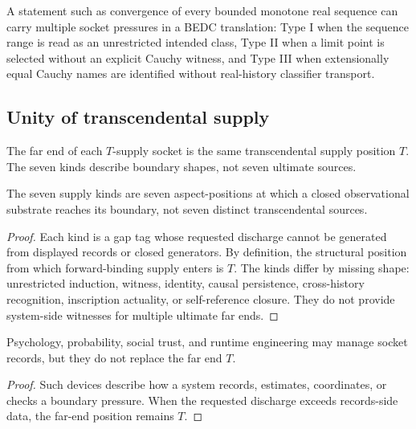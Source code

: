 \begin{example}
\label{ex:philosophy-analysis-socket-stack}
A statement such as convergence of every bounded monotone real sequence
can carry multiple socket pressures in a BEDC translation: Type I when
the sequence range is read as an unrestricted intended class, Type II
when a limit point is selected without an explicit Cauchy witness, and
Type III when extensionally equal Cauchy names are identified without
real-history classifier transport.
\end{example}

\subsection{Unity of transcendental supply}
\label{subsec:philosophy-unity-transcendental-supply}

\begin{definition}
\label{def:philosophy-single-t-principle}
The far end of each \(T\)-supply socket is the same transcendental
supply position \(T\). The seven kinds describe boundary shapes, not
seven ultimate sources.
\end{definition}

\begin{theorem}
\label{thm:philosophy-seven-sockets-one-supply-position}
The seven supply kinds are seven aspect-positions at which a closed
observational substrate reaches its boundary, not seven distinct
transcendental sources.
\end{theorem}
\begin{proof}
Each kind is a gap tag whose requested discharge cannot be generated
from displayed records or closed generators. By definition, the
structural position from which forward-binding supply enters is \(T\).
The kinds differ by missing shape: unrestricted induction, witness,
identity, causal persistence, cross-history recognition, inscription
actuality, or self-reference closure. They do not provide
system-side witnesses for multiple ultimate far ends.
\end{proof}

\begin{corollary}
\label{cor:philosophy-records-management-not-replace-t}
Psychology, probability, social trust, and runtime engineering may
manage socket records, but they do not replace the far end \(T\).
\end{corollary}
\begin{proof}
Such devices describe how a system records, estimates, coordinates, or
checks a boundary pressure. When the requested discharge exceeds
records-side data, the far-end position remains \(T\).
\end{proof}

